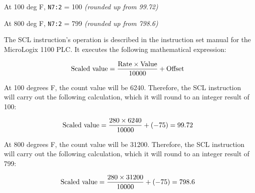 
At 100 deg F, {\tt N7:2} = 100 {\it (rounded up from 99.72)}

\vskip 10pt

At 800 deg F, {\tt N7:2} = 799 {\it (rounded up from 798.6)}







The SCL instruction's operation is described in the instruction set manual for the MicroLogix 1100 PLC.  It executes the following mathematical expression:

$$\hbox{Scaled value} = {\hbox{Rate} \times \hbox{Value} \over 10000} + \hbox{Offset}$$

\vskip 10pt

At 100 degrees F, the count value will be 6240.  Therefore, the SCL instruction will carry out the following calculation, which it will round to an integer result of 100:

$$\hbox{Scaled value} = {280 \times 6240 \over 10000} + (-75) = 99.72$$

\vskip 10pt

At 800 degrees F, the count value will be 31200.  Therefore, the SCL instruction will carry out the following calculation, which it will round to an integer result of 799:

$$\hbox{Scaled value} = {280 \times 31200 \over 10000} + (-75) = 798.6$$





